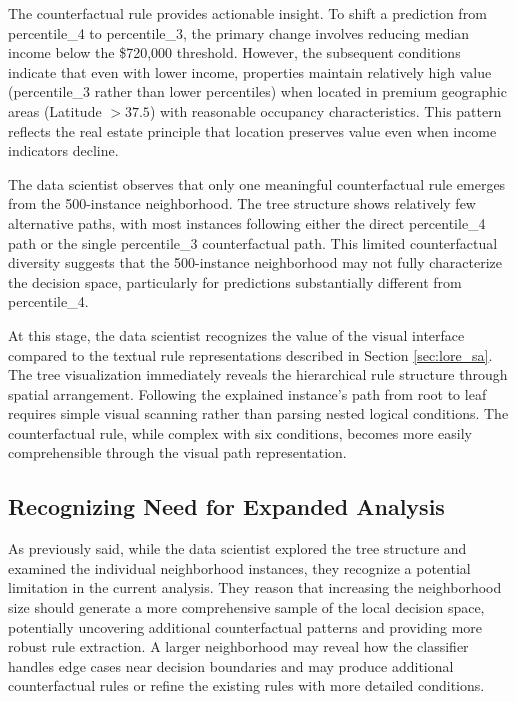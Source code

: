 The counterfactual rule provides actionable insight. To shift a prediction from percentile\_4 to percentile\_3, the primary change involves reducing median income below the \$720,000 threshold. However, the subsequent conditions indicate that even with lower income, properties maintain relatively high value (percentile\_3 rather than lower percentiles) when located in premium geographic areas (Latitude $> 37.5$) with reasonable occupancy characteristics. This pattern reflects the real estate principle that location preserves value even when income indicators decline.

The data scientist observes that only one meaningful counterfactual rule emerges from the 500-instance neighborhood. The tree structure shows relatively few alternative paths, with most instances following either the direct percentile\_4 path or the single percentile\_3 counterfactual path. This limited counterfactual diversity suggests that the 500-instance neighborhood may not fully characterize the decision space, particularly for predictions substantially different from percentile\_4.

At this stage, the data scientist recognizes the value of the visual interface compared to the textual rule representations described in Section \ref{sec:lore_sa}. The tree visualization immediately reveals the hierarchical rule structure through spatial arrangement. Following the explained instance's path from root to leaf requires simple visual scanning rather than parsing nested logical conditions. The counterfactual rule, while complex with six conditions, becomes more easily comprehensible through the visual path representation.

\subsection{Recognizing Need for Expanded Analysis}

As previously said, while the data scientist explored the tree structure and examined the individual neighborhood instances, they recognize a potential limitation in the current analysis. They reason that increasing the neighborhood size should generate a more comprehensive sample of the local decision space, potentially uncovering additional counterfactual patterns and providing more robust rule extraction. A larger neighborhood may reveal how the classifier handles edge cases near decision boundaries and may produce additional counterfactual rules or refine the existing rules with more detailed conditions.

